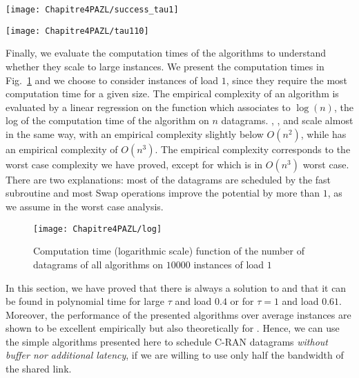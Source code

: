\begin{minipage}[c]{.49\linewidth} 
\begin{center} 
\texttt{[image: Chapitre4PAZL/success\_tau1]} 
\end{center}
\label{fig:tau1}
\end{minipage}
\begin{minipage}[c]{.45\linewidth} 

\begin{center}
\texttt{[image: Chapitre4PAZL/tau110]}
\end{center}
\label{fig:tau1-10mess}
\end{minipage}
 \vspace{1cm}

 Finally, we evaluate the computation times of the algorithms to understand whether they scale to large instances. We present the computation times in Fig.~\ref{fig:timelog} and we choose to consider instances of load $1$, since they require the most computation time for a given size. The empirical complexity of an algorithm is evaluated by a
 linear regression on the function which associates to $\log(n)$, the log of the computation time of the algorithm on $n$ datagrams.  \firstfit, \greedyuniform, \shortestlongest and \swapandmove scale almost in the same way, with an empirical complexity slightly below $O(n^2)$, while \greedypotential has an empirical complexity of $O(n^3)$. The empirical complexity corresponds to the worst case complexity we have proved, except for \swapandmove which is in $O(n^3)$ worst case. There are two explanations: most of the datagrams are scheduled by the fast \firstfit subroutine and most Swap operations improve the potential by more than $1$, as we assume in the worst case analysis.

\begin{figure}
 \begin{center}
\texttt{[image: Chapitre4PAZL/log]}
\end{center}
\caption{Computation time (logarithmic scale) function of the number of datagrams of all algorithms on $10000$ instances of load $1$}
\label{fig:timelog}
\end{figure}




In this section, we have proved that there is always a solution to \pma and that it can be found in polynomial time for large $\tau$ and load  $0.4$ or for $\tau = 1$ and load $0.61$. Moreover, the performance of the presented algorithms over average instances are shown to be excellent empirically but also theoretically for \greedyuniform.
Hence, we can use the simple algorithms presented here to schedule C-RAN datagrams \emph{without buffer nor additional latency}, if we are willing to use only half the bandwidth of the shared link. 

